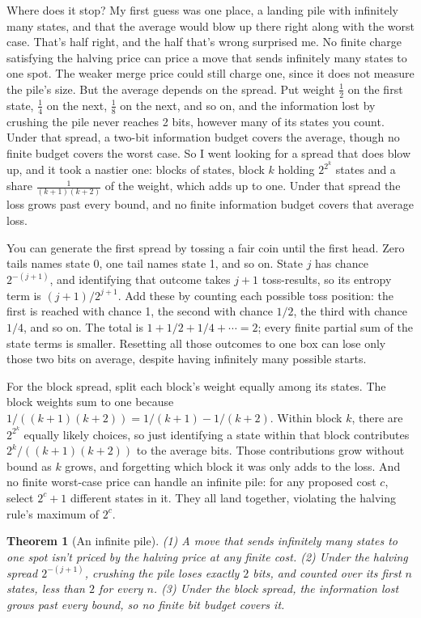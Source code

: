 \documentclass[11pt,twoside]{article}
\theoremstyle{thielethm}
\newtheorem{theorem}{Theorem}[section]
\theoremstyle{thieledef}
\theoremstyle{thieledef}
\theoremstyle{thieledef}
\theoremstyle{thielethm}
\theoremstyle{thieleobs}
\theoremstyle{thielethm}
\begin{document}
Where does it stop? My first guess was one place, a landing pile with infinitely many states, and
that the average would blow up there right along with the worst case. That's half right, and the
half that's wrong surprised me. No finite charge satisfying the halving price can price a move that sends infinitely many states
to one spot. The weaker merge price could still charge one, since it does not measure the pile's size. But the average depends on the spread. Put weight $\tfrac12$ on
the first state, $\tfrac14$ on the next, $\tfrac18$ on the next, and so on, and the information lost
by crushing the pile never reaches 2 bits, however many of its states you count. Under that spread,
a two-bit information budget covers the average, though no finite budget covers the worst case. So I went looking
for a spread that does blow up, and it took a nastier one: blocks of states, block $k$ holding
$2^{2^k}$ states and a share $\frac{1}{(k+1)(k+2)}$ of the weight, which adds up to one. Under that
spread the loss grows past every bound, and no finite information budget covers that average loss.

You can generate the first spread by tossing a fair coin until the first head.
Zero tails names state 0, one tail names state 1, and so on. State $j$ has chance
$2^{-(j+1)}$, and identifying that outcome takes $j+1$ toss-results, so its entropy
term is $(j+1)/2^{j+1}$. Add these by counting each possible toss position:
the first is reached with chance 1, the second with chance $1/2$, the third with
chance $1/4$, and so on. The total is $1+1/2+1/4+\cdots=2$; every finite partial
sum of the state terms is smaller. Resetting all those outcomes to one box can
lose only those two bits on average, despite having infinitely many possible starts.

For the block spread, split each block's weight equally among its states. The block
weights sum to one because $1/((k+1)(k+2))=1/(k+1)-1/(k+2)$. Within block $k$,
there are $2^{2^k}$ equally likely choices, so just identifying a state within that
block contributes $2^k/((k+1)(k+2))$ to the average bits. Those contributions grow
without bound as $k$ grows, and forgetting which block it was only adds to the loss.
And no finite worst-case price can handle an infinite pile: for any proposed cost
$c$, select $2^c+1$ different states in it. They all land together, violating the
halving rule's maximum of $2^c$.

\begin{theorem}[An infinite pile]\label{thm:dir-infinite}
(1) A move that sends infinitely many states to one spot isn't priced by the halving price at any
finite cost. (2) Under the halving spread $2^{-(j+1)}$, crushing the pile loses exactly $2$ bits, and counted over its first $n$ states, less than $2$ for every $n$. (3) Under the block spread, the information lost
grows past every bound, so no finite bit budget covers it.
\end{theorem}
\end{document}
